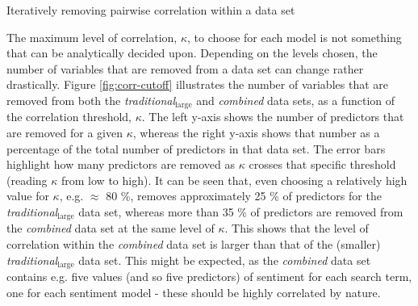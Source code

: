 \documentclass{article}
\begin{document}
\vspace{5mm}

\begin{algorithm}[H]
  \caption{Iteratively removing pairwise correlation within a data set}
  \label{alg-corr-cutoff}

  \BlankLine
  \BlankLine

  
  \BlankLine
  \BlankLine
  

  \BlankLine
\end{algorithm}

\vspace{5mm} 

The maximum level of correlation, $\kappa$, to choose for each model is not something that can be analytically decided upon. Depending on the levels chosen, the number of variables that are removed from a data set can change rather drastically. Figure \ref{fig:corr-cutoff} illustrates the number of variables that are removed from both the \emph{traditional$_{\text{large}}$} and \emph{combined} data sets, as a function of the correlation threshold, $\kappa$. The left y-axis shows the number of predictors that are removed for a given $\kappa$, whereas the right y-axis shows that number as a percentage of the total number of predictors in that data set. The error bars highlight how many predictors are removed as $\kappa$ crosses that specific threshold (reading $\kappa$ from low to high). It can be seen that, even choosing a relatively high value for $\kappa$, e.g. $\approx$ 80 \%, removes approximately 25 \% of predictors for the \emph{traditional$_{\text{large}}$} data set, whereas more than 35 \% of predictors are removed from the \emph{combined} data set at the same level of $\kappa$. This shows that the level of correlation within the \emph{combined} data set is larger than that of the (smaller) \emph{traditional$_{\text{large}}$} data set. This might be expected, as the \emph{combined} data set contains e.g. five values (and so five predictors) of sentiment for each search term, one for each sentiment model - these should be highly correlated by nature.
\end{document}
